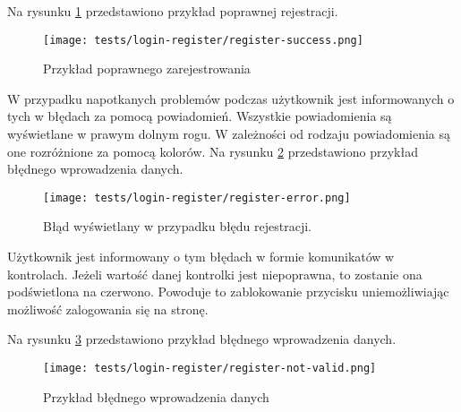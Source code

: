 Na rysunku \ref{success_register} przedstawiono przykład poprawnej rejestracji.
\begin{figure}[H]
  \centering
  \texttt{[image: tests/login-register/register-success.png]}
  \caption{Przykład poprawnego zarejestrowania}
  \label{success_register}
\end{figure}
W przypadku napotkanych problemów podczas użytkownik jest informowanych o tych w błędach za pomocą powiadomień. Wszystkie powiadomienia są wyświetlane w prawym dolnym rogu. W zależności od rodzaju powiadomienia są one rozróżnione za pomocą kolorów. Na rysunku \ref{register_error} przedstawiono przykład błędnego wprowadzenia danych.
\begin{figure}[H]
  \centering
  \texttt{[image: tests/login-register/register-error.png]}
  \caption{Błąd wyświetlany w przypadku błędu rejestracji.}
  \label{register_error}
\end{figure}
Użytkownik jest informowany o tym błędach w formie komunikatów w kontrolach. Jeżeli wartość danej kontrolki jest niepoprawna, to zostanie ona podświetlona na czerwono. Powoduje to zablokowanie przycisku uniemożliwiając możliwość zalogowania się na stronę.

Na rysunku \ref{login_error} przedstawiono przykład błędnego wprowadzenia danych.
\begin{figure}[H]
  \centering
  \texttt{[image: tests/login-register/register-not-valid.png]}
  \caption{Przykład błędnego wprowadzenia danych}
  \label{login_error}
\end{figure}

